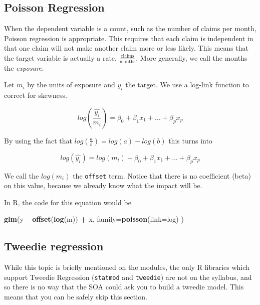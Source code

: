 \documentclass[]{book}
\newenvironment{Shaded}{\begin{snugshade}}{\end{snugshade}}
\newcommand{\DataTypeTok}[1]{\textcolor[rgb]{0.13,0.29,0.53}{#1}}
\newcommand{\KeywordTok}[1]{\textcolor[rgb]{0.13,0.29,0.53}{\textbf{#1}}}
\newcommand{\NormalTok}[1]{#1}
\newcommand{\OperatorTok}[1]{\textcolor[rgb]{0.81,0.36,0.00}{\textbf{#1}}}
\newcommand{\StringTok}[1]{\textcolor[rgb]{0.31,0.60,0.02}{#1}}
\begin{document}
\hypertarget{poisson-regression}{%
\subsection{Poisson Regression}\label{poisson-regression}}

When the dependent variable is a count, such as the number of claims per month, Poisson regression is appropriate. This requires that each claim is independent in that one claim will not make another claim more or less likely. This means that the target variable is actually a rate, \(\frac{\text{claims}}{\text{months}}\). More generally, we call the months the \emph{exposure}.

Let \(m_i\) by the units of exposure and \(y_i\) the target. We use a log-link function to correct for skewness.

\[ log(\frac{\hat{y_i}}{m_i}) = \beta_0 + \beta_1 x_1 + ... + \beta_p x_p\]

By using the fact that \(log(\frac{a}{b}) = log(a) - log(b)\) this turns into

\[log(\hat{y_i}) = log(m_i) + \beta_0 + \beta_1 x_1 + ... + \beta_p x_p\]

We call the \(log(m_i)\) the \texttt{offset} term. Notice that there is no coefficient (beta) on this value, because we already know what the impact will be.

In R, the code for this equation would be

\begin{Shaded}
\begin{Highlighting}[]
\KeywordTok{glm}\NormalTok{(y }\OperatorTok{~}\StringTok{ }\KeywordTok{offset}\NormalTok{(}\KeywordTok{log}\NormalTok{(m)) }\OperatorTok{+}\StringTok{ }\NormalTok{x, }\DataTypeTok{family=}\KeywordTok{poisson}\NormalTok{(}\DataTypeTok{link=}\NormalTok{log) )}
\end{Highlighting}
\end{Shaded}

\hypertarget{tweedie-regression}{%
\subsection{Tweedie regression}\label{tweedie-regression}}

While this topic is briefly mentioned on the modules, the only R libraries which support Tweedie Regression (\texttt{statmod} and \texttt{tweedie}) are not on the syllabus, and so there is no way that the SOA could ask you to build a tweedie model. This means that you can be safely skip this section.
\end{document}

